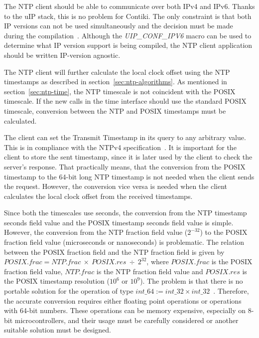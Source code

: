 The NTP client should be able to communicate over both IPv4 and IPv6.
Thanks to the uIP stack, this is no problem for Contiki.
The only constraint is that both IP versions can not be used simultaneously
and the decision must be made during the compilation~\cite{contiki-docs}.
Although the {\it{UIP\_CONF\_IPV6}} macro can be used to determine what IP version
support is being compiled, the NTP client application should be written IP-version agnostic.

The NTP client will further calculate the local clock offset using the NTP timestamps
as described in section~\ref{sec:ntp-algorithms}.
As mentioned in section~\ref{sec:ntp-time}, the NTP timescale is not
coincident with the POSIX timescale.
If the new calls in the time interface should use the standard POSIX timescale,
conversion between the NTP and POSIX timestamps must be calculated.

The client can set the Transmit Timestamp in its query to any arbitrary value.
This is in compliance with the NTPv4 specification~\cite{rfc5905}.
It is important for the client to store the sent timestamp,
since it is later used by the client to check the server's response.
That practically means, that the conversion from the POSIX timestamp to the 64-bit long NTP timestamp
is not needed when the client sends the request.
However, the conversion vice versa is needed when the client calculates
the local clock offset from the received timestamps.

Since both the timescales use seconds, the conversion from
the NTP timestamp seconds field value and the POSIX timestamp seconds field value is simple.
However, the conversion from the NTP fraction field value ($2^{-32}$)
to the POSIX fraction field value (microseconds or nanoseconds) is problematic.
The relation between the POSIX fraction field and the NTP fraction field
is given by $POSIX.frac = NTP.frac~\times~POSIX.res~\div~2^{32}$,
where $POSIX.frac$ is the POSIX fraction field value,
$NTP.frac$ is the NTP fraction field value and
$POSIX.res$ is the POSIX timestamp resolution ($10^6$ or $10^9$).
The problem is that there is no portable solution for the operation of type $int\_64 := int\_32 \times int\_32$~\cite{c99}.
Therefore, the accurate conversion requires either floating point operations or operations with 64-bit numbers.
These operations can be memory expensive, especially on 8-bit microcontrollers,
and their usage must be carefully considered or another suitable solution must be designed.
